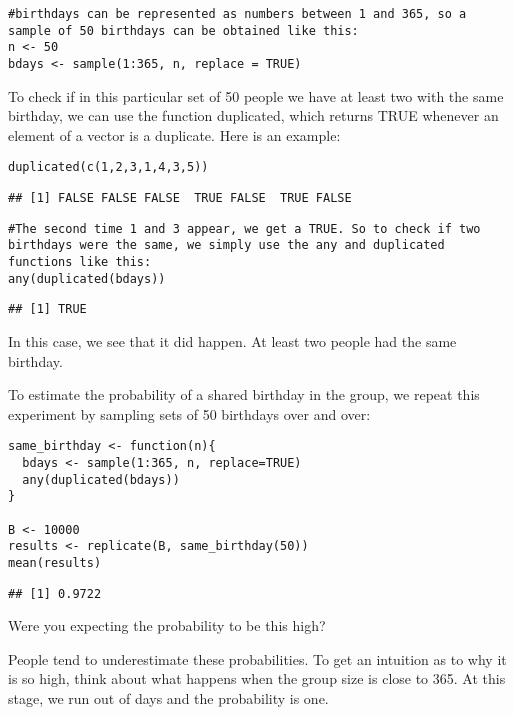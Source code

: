 \documentclass[
]{article}
\begin{document}
\begin{verbatim}
#birthdays can be represented as numbers between 1 and 365, so a sample of 50 birthdays can be obtained like this:
n <- 50
bdays <- sample(1:365, n, replace = TRUE)
\end{verbatim}

To check if in this particular set of 50 people we have at least two
with the same birthday, we can use the function duplicated, which
returns TRUE whenever an element of a vector is a duplicate. Here is an
example:

\begin{verbatim}
duplicated(c(1,2,3,1,4,3,5))
\end{verbatim}

\begin{verbatim}
## [1] FALSE FALSE FALSE  TRUE FALSE  TRUE FALSE
\end{verbatim}

\begin{verbatim}
#The second time 1 and 3 appear, we get a TRUE. So to check if two birthdays were the same, we simply use the any and duplicated functions like this:
any(duplicated(bdays))
\end{verbatim}

\begin{verbatim}
## [1] TRUE
\end{verbatim}

In this case, we see that it did happen. At least two people had the
same birthday.

To estimate the probability of a shared birthday in the group, we repeat
this experiment by sampling sets of 50 birthdays over and over:

\begin{verbatim}
same_birthday <- function(n){
  bdays <- sample(1:365, n, replace=TRUE)
  any(duplicated(bdays))
}

B <- 10000
results <- replicate(B, same_birthday(50))
mean(results)
\end{verbatim}

\begin{verbatim}
## [1] 0.9722
\end{verbatim}

Were you expecting the probability to be this high?

People tend to underestimate these probabilities. To get an intuition as
to why it is so high, think about what happens when the group size is
close to 365. At this stage, we run out of days and the probability is
one.
\end{document}
